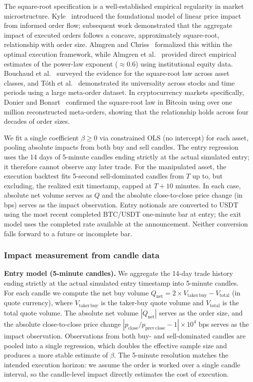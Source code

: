 \documentclass{ieeeaccess}
\begin{document}
The square-root specification is a well-established empirical regularity in market microstructure. Kyle~\cite{kyle1985continuous} introduced the foundational model of linear price impact from informed order flow; subsequent work demonstrated that the aggregate impact of executed orders follows a concave, approximately square-root, relationship with order size. Almgren and Chriss~\cite{almgren2001optimal} formalized this within the optimal execution framework, while Almgren et al.~\cite{almgren2005direct} provided direct empirical estimates of the power-law exponent ($\approx 0.6$) using institutional equity data. Bouchaud et al.~\cite{bouchaud2009markets} surveyed the evidence for the square-root law across asset classes, and T\'{o}th et al.~\cite{toth2011anomalous} demonstrated its universality across stocks and time periods using a large meta-order dataset. In cryptocurrency markets specifically, Donier and Bonart~\cite{donier2015million} confirmed the square-root law in Bitcoin using over one million reconstructed meta-orders, showing that the relationship holds across four decades of order sizes.

We fit a single coefficient $\beta \geq 0$ via constrained OLS (no intercept) for each asset, pooling absolute impacts from both buy and sell candles. The entry regression uses the 14 days of 5-minute candles ending strictly at the actual simulated entry; it therefore cannot observe any later trade. For the manipulated asset, the execution backtest fits 5-second sell-dominated candles from $T$ up to, but excluding, the realized exit timestamp, capped at $T+10$ minutes. In each case, absolute net volume serves as $Q$ and the absolute close-to-close price change (in bps) serves as the impact observation. Entry notionals are converted to USDT using the most recent completed BTC/USDT one-minute bar at entry; the exit model uses the completed rate available at the announcement. Neither conversion falls forward to a future or incomplete bar.

\subsubsection{Impact measurement from candle data}
\textbf{Entry model (5-minute candles).} We aggregate the 14-day trade history ending strictly at the actual simulated entry timestamp into 5-minute candles. For each candle we compute the net buy volume $Q_{\mathrm{net}} = 2 \times V_{\mathrm{taker\,buy}} - V_{\mathrm{total}}$ (in quote currency), where $V_{\mathrm{taker\,buy}}$ is the taker-buy quote volume and $V_{\mathrm{total}}$ is the total quote volume. The absolute net volume $|Q_{\mathrm{net}}|$ serves as the order size, and the absolute close-to-close price change $|p_{\mathrm{close}} / p_{\mathrm{prev\,close}} - 1| \times 10^4$ bps serves as the impact observation. Observations from both buy- and sell-dominated candles are pooled into a single regression, which doubles the effective sample size and produces a more stable estimate of $\beta$. The 5-minute resolution matches the intended execution horizon: we assume the order is worked over a single candle interval, so the candle-level impact directly estimates the cost of execution.
\end{document}

